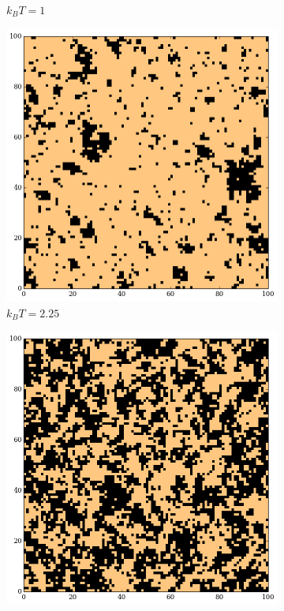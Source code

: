 \documentclass{scrartcl}
\begin{document}
\begin{figure}[H]
\begin{subfigure}{.32\textwidth}
        \caption{$k_BT = 1$}
    \end{subfigure}%
    \begin{subfigure}{.32\textwidth}
        \includegraphics[width=\textwidth]{plots/sc_r_2_25.png}
        \caption{$k_BT = 2.25$}
    \end{subfigure}%
    \begin{subfigure}{.32\textwidth}
        \includegraphics[width=\textwidth]{plots/sc_r_3.png}

\end{subfigure}
\end{figure}
\end{document}
